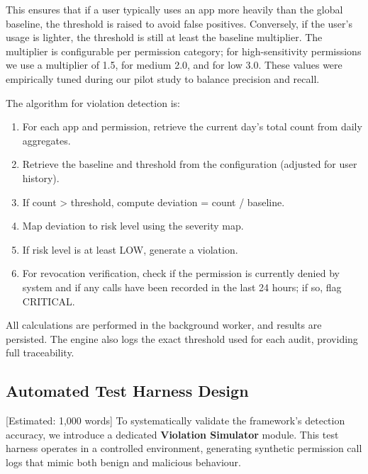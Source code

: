 This ensures that if a user typically uses an app more heavily than the global baseline, the threshold is raised to avoid false positives. Conversely, if the user's usage is lighter, the threshold is still at least the baseline multiplier. The multiplier is configurable per permission category; for high-sensitivity permissions we use a multiplier of 1.5, for medium 2.0, and for low 3.0. These values were empirically tuned during our pilot study to balance precision and recall.

The algorithm for violation detection is:

\begin{enumerate}
\item For each app and permission, retrieve the current day's total count from daily aggregates.
\item Retrieve the baseline and threshold from the configuration (adjusted for user history).
\item If count > threshold, compute deviation = count / baseline.
\item Map deviation to risk level using the severity map.
\item If risk level is at least LOW, generate a violation.
\item For revocation verification, check if the permission is currently denied by system and if any calls have been recorded in the last 24 hours; if so, flag CRITICAL.
\end{enumerate}

All calculations are performed in the background worker, and results are persisted. The engine also logs the exact threshold used for each audit, providing full traceability.

\subsection{Automated Test Harness Design} [Estimated: 1,000 words]
To systematically validate the framework's detection accuracy, we introduce a dedicated \textbf{Violation Simulator} module. This test harness operates in a controlled environment, generating synthetic permission call logs that mimic both benign and malicious behaviour.


